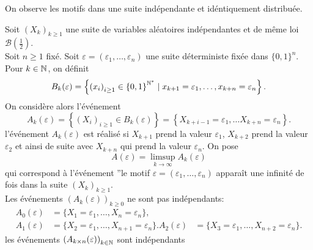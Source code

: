 \begin{example}
    On observe les motifs dans une suite indépendante et idéntiquement distribuée.

    Soit \({(X_k)}_{k\geq 1}\) une suite de variables aléatoires indépendantes
    et de même loi \(\mathcal B(\frac12)\).\\
    Soit \(n\geq 1\) fixé. Soit \(\varepsilon = \left(\varepsilon_1,\ldots,\varepsilon_n\right)\)
    une suite déterministe fixée dans \({\{0,1\}}^n\).\\
    Pour \(k\in\mathbb{N}\), on définit
    \begin{equation*}
        B_k(\varepsilon) = \left\{ {(x_i)}_{i\geq 1}\in{\{0,1\}}^{\mathbb{N}^\ast}
        \mid x_{k+1} = \varepsilon_1, \ldots, x_{k+n} = \varepsilon_n \right\}.
    \end{equation*}
    On considère alors l'événement
    \begin{equation*}
        A_k(\varepsilon) = \left\{ {(X_i)}_{i\geq 1}\in B_k(\varepsilon) \right\} = \left\{ X_{k+i-1} = \varepsilon_1,\ldots X_{k+n} = \varepsilon_n \right\}.
    \end{equation*}
    l'événement \(A_k(\varepsilon)\) est réalisé si \(X_{k+1}\) prend la valeur
    \(\varepsilon_1\), \(X_{k+2}\) prend la valeur \(\varepsilon_2\) et ainsi de suite 
    avec \(X_{k+n}\) qui prend la valeur \(\varepsilon_n\). On pose
    \begin{equation*}
        A(\varepsilon)
        = \limsup_{k\to\infty} A_k(\varepsilon)
    \end{equation*}
    qui correspond à l'événement ''le motif \(\varepsilon = \left(\varepsilon_1,\ldots,\varepsilon_n\right)\)
    apparaît une infinité de fois dans la suite \({(X_k)}_{k\geq 1}\)\fg{}.\\
    Les événements \({(A_k(\varepsilon))}_{k\geq 0}\) ne sont pas indépendants:
    \begin{equation*}
        \begin{aligned}
            A_0(\varepsilon) &= \{X_1 = \varepsilon_1,\ldots,X_n = \varepsilon_n\},\\
            A_1(\varepsilon) &= \{X_2 = \varepsilon_1,\ldots,X_{n+1} = \varepsilon_n\}.
            A_2(\varepsilon) &= \{X_3 = \varepsilon_1,\ldots,X_{n+2} = \varepsilon_n\}.
        \end{aligned}
    \end{equation*}
    les événements \({(A_{k\times n}(\varepsilon))}_{k\in \mathbb{N}}\) sont indépendants
    \begin{equation*}

\end{equation*}
\end{example}
